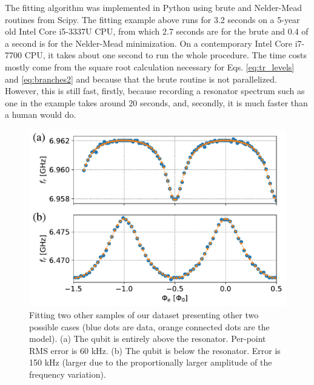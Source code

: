 \documentclass[%
 aip,
 amsmath,amssymb,
 reprint,%
]{revtex4-1}
\begin{document}
The fitting algorithm was implemented in Python using brute and Nelder-Mead routines from Scipy. The fitting example above runs for 3.2 seconds on a 5-year old Intel Core i5-3337U CPU, from which 2.7 seconds are for the brute and 0.4 of a second is for the Nelder-Mead minimization. On a contemporary Intel Core i7-7700 CPU, it takes about one second to run the whole procedure. The time costs mostly come from the square root calculation necessary for Eqs. \eqref{eq:tr_levels} and \eqref{eq:branches2} and because that the brute routine is not parallelized. However, this is still fast, firstly, because recording a resonator spectrum such as one in the example takes around 20 seconds, and, secondly, it is much faster than a human would do. 

\begin{figure}
\centering
\includegraphics[width=\linewidth]{fit_other_cases}
\caption{Fitting two other samples of our dataset presenting other two possible cases (blue dots are data, orange connected dots are the model). (a) The qubit is entirely above the resonator. Per-point RMS error is 60 kHz. (b) The qubit is below the resonator. Error is 150 kHz (larger due to the proportionally larger amplitude of the frequency variation).}
\label{fit-other-cases}
\end{figure}
\end{document}
